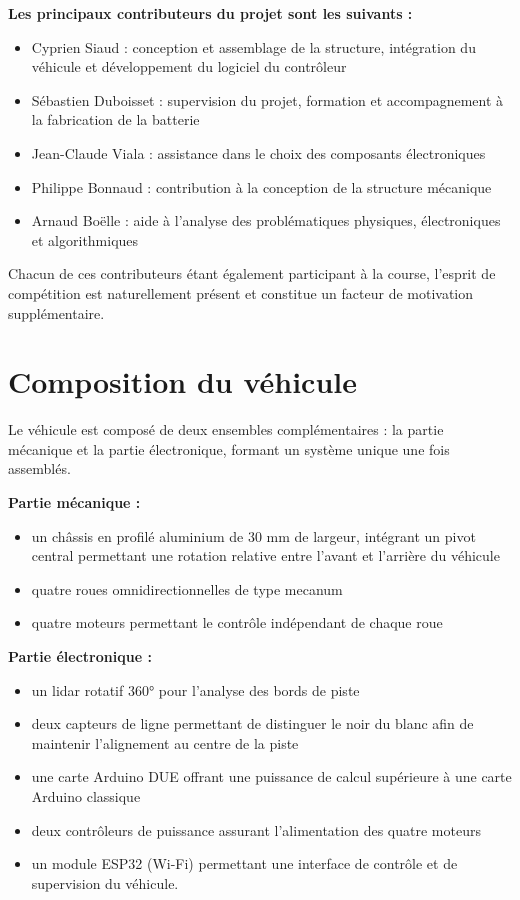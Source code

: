 \documentclass[a4paper,12pt]{book}
\begin{document}
\textbf{Les principaux contributeurs du projet sont les suivants :}
\begin{itemize}
  \item Cyprien Siaud : conception et assemblage de la structure, intégration du véhicule et développement du logiciel du contrôleur
  \item Sébastien Duboisset : supervision du projet, formation et accompagnement à la fabrication de la batterie
  \item Jean-Claude Viala : assistance dans le choix des composants électroniques
  \item Philippe Bonnaud : contribution à la conception de la structure mécanique
  \item Arnaud Boëlle : aide à l’analyse des problématiques physiques, électroniques et algorithmiques
\end{itemize}

Chacun de ces contributeurs étant également participant à la course, l’esprit de compétition est naturellement présent et constitue un facteur de motivation supplémentaire.

\section{Composition du véhicule}

Le véhicule est composé de deux ensembles complémentaires : la partie mécanique et la partie électronique, formant un système unique une fois assemblés.
\vspace{1em}

\textbf{Partie mécanique :}
\begin{itemize}
  \item un châssis en profilé aluminium de 30 mm de largeur, intégrant un pivot central permettant une rotation relative entre l’avant et l’arrière du véhicule
  \item quatre roues omnidirectionnelles de type mecanum
  \item quatre moteurs permettant le contrôle indépendant de chaque roue
\end{itemize}

\vspace{1em}

\textbf{Partie électronique :}
\begin{itemize}
  \item un lidar rotatif 360° pour l’analyse des bords de piste
  \item deux capteurs de ligne permettant de distinguer le noir du blanc afin de maintenir l’alignement au centre de la piste
  \item une carte Arduino DUE offrant une puissance de calcul supérieure à une carte Arduino classique
  \item deux contrôleurs de puissance assurant l’alimentation des quatre moteurs
  \item un module ESP32 (Wi-Fi) permettant une interface de contrôle et de supervision du véhicule.
\end{itemize}
\end{document}
